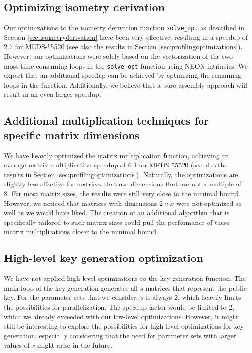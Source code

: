 \documentclass[11pt,a4paper]{report}
\theoremstyle{definition}
\begin{document}
\subsection*{Optimizing isometry derivation}
Our optimizations to the isometry derivation function \texttt{solve\_opt} as described in Section \ref{sec:isometryderivation} have been very effective, resulting in a speedup of 2.7 for MEDS-55520 (see also the results in Section \ref{sec:profilingoptimizations}). However, our optimizations were solely based on the vectorization of the two most time-consuming loops in the \texttt{solve\_opt} function using NEON intrinsics. We expect that an additional speedup can be achieved by optimizing the remaining loops in the function. Additionally, we believe that a pure-assembly approach will result in an even larger speedup.

\subsection*{Additional multiplication techniques for specific matrix dimensions}
We have heavily optimized the matrix multiplication function, achieving an average matrix multiplication speedup of 6.9 for MEDS-55520 (see also the results in Section \ref{sec:profilingoptimizations}). Naturally, the optimizations are slightly less effective for matrices that use dimensions that are not a multiple of 8. For most matrix sizes, the results were still very close to the minimal bound. However, we noticed that matrices with dimensions $2 \times x$ were not optimized as well as we would have liked. The creation of an additional algorithm that is specifically tailored to such matrix sizes could pull the performance of these matrix multiplications closer to the minimal bound.

\subsection*{High-level key generation optimization}
We have not applied high-level optimizations to the key generation function. The main loop of the key generation generates all $s$ matrices that represent the public key. For the parameter sets that we consider, $s$ is always 2, which heavily limits the possibilities for parallelization. The speedup factor would be limited to 2, which we already exceeded with our low-level optimizations. However, it might still be interesting to explore the possibilities for high-level optimizations for key generation, especially considering that the need for parameter sets with larger values of $s$ might arise in the future.
\end{document}
